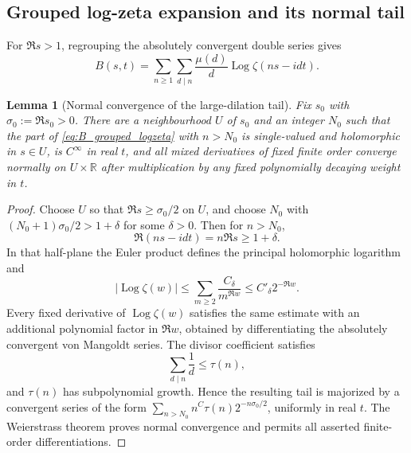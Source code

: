 \documentclass[11pt]{amsart}
\numberwithin{equation}{section}
\theoremstyle{plain}
\newtheorem{lemma}[theorem]{Lemma}
\theoremstyle{definition}
\theoremstyle{remark}
\newcommand{\Log}{\operatorname{Log}}
\begin{document}
\subsection{Grouped log-zeta expansion and its normal tail}
\label{subsec:B_grouped_continuation}

For \(\Re s>1\), regrouping the absolutely convergent double series gives
\begin{equation}
\boxed{
B(s,t)=
\sum_{n\ge1}\sum_{d\mid n}\frac{\mu(d)}d
\Log\zeta(ns-idt).}
\label{eq:B_grouped_logzeta}
\end{equation}

\begin{lemma}[Normal convergence of the large-dilation tail]
\label{lem:B_tail_normal}
Fix \(s_0\) with \(\sigma_0:=\Re s_0>0\).  There are a neighbourhood
\(U\) of \(s_0\) and an integer \(N_0\) such that the part of
\eqref{eq:B_grouped_logzeta} with \(n>N_0\) is single-valued and holomorphic
in \(s\in U\), is \(C^\infty\) in real \(t\), and all mixed derivatives of
fixed finite order converge normally on \(U\times\mathbb R\) after
multiplication by any fixed polynomially decaying weight in \(t\).
\end{lemma}

\begin{proof}
Choose \(U\) so that \(\Re s\ge\sigma_0/2\) on \(U\), and choose
\(N_0\) with \((N_0+1)\sigma_0/2>1+\delta\) for some \(\delta>0\).  Then for
\(n>N_0\),
\begin{equation}
\Re(ns-idt)=n\Re s\ge1+\delta.
\label{eq:tail_right_halfplane}
\end{equation}
In that half-plane the Euler product defines the principal holomorphic
logarithm and
\begin{equation}
|\Log\zeta(w)|
\le
\sum_{m\ge2}\frac{C_\delta}{m^{\Re w}}
\le C'_\delta 2^{-\Re w}.
\label{eq:logzeta_exponential_tail}
\end{equation}
Every fixed derivative of \(\Log\zeta(w)\) satisfies the same estimate with
an additional polynomial factor in \(\Re w\), obtained by differentiating
the absolutely convergent von Mangoldt series.  The divisor coefficient
satisfies
\begin{equation}
\sum_{d\mid n}\frac1d\le \tau(n),
\label{eq:divisor_coeff_bound}
\end{equation}
and \(\tau(n)\) has subpolynomial growth.  Hence the resulting tail is
majorized by a convergent series of the form
\(\sum_{n>N_0}n^C\tau(n)2^{-n\sigma_0/2}\), uniformly in real \(t\).
The Weierstrass theorem proves normal convergence and permits all asserted
finite-order differentiations.
\end{proof}
\end{document}

